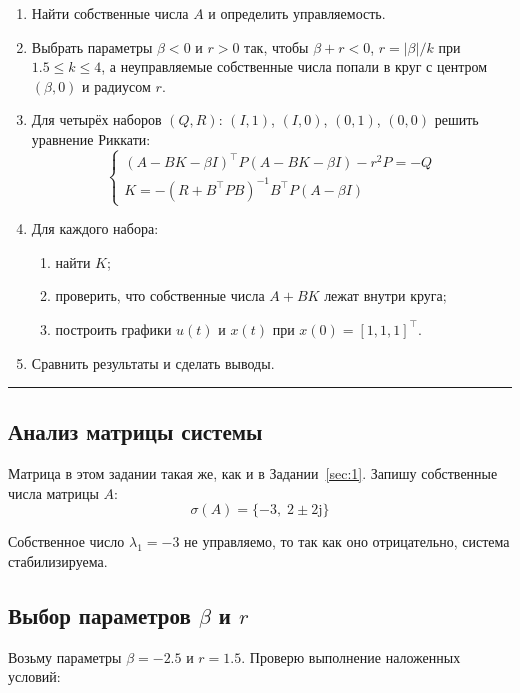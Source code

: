 \documentclass[a4paper,12pt]{article}
\begin{document}
	\begin{enumerate}
		\item Найти собственные числа $A$ и определить управляемость.
		
		\item Выбрать параметры $\beta < 0$ и $r > 0$ так, чтобы $\beta + r < 0$, $r = |\beta|/k$ при $1.5 \leq k \leq 4$, а неуправляемые собственные числа попали в круг с центром $(\beta, 0)$ и радиусом $r$.
		
		\item Для четырёх наборов $(Q, R)$: $(I, 1)$, $(I, 0)$, $(0, 1)$, $(0, 0)$ решить уравнение Риккати:
		\[
		\begin{cases}
			(A - BK - \beta I)^\top P (A - BK - \beta I) - r^2 P = -Q \\[8pt]
			K = -(R + B^\top P B)^{-1} B^\top P (A - \beta I)
		\end{cases}
		\]
		
		\item Для каждого набора:
		\begin{enumerate}
			\item[a)] найти $K$;
			\item[б)] проверить, что собственные числа $A+BK$ лежат внутри круга;
			\item[в)] построить графики $u(t)$ и $x(t)$ при $x(0) = [1,1,1]^\top$.
		\end{enumerate}
		
		\item Сравнить результаты и сделать выводы.
	\end{enumerate}
	
	\hrule \newpage
	
	\subsection{Анализ матрицы системы}
	
	Матрица в этом задании такая же, как и в Задании~\ref{sec:1}. Запишу собственные числа матрицы \(A\):	
	\[
	\sigma(A) = \{-3,\; 2 \pm 2\mathrm{j}\}
	\]
	
	Собственное число \(\lambda_1 = -3\) не управляемо, то так как оно отрицательно, система стабилизируема.
	
	\subsection{Выбор параметров $\beta$ и $r$}
	
	Возьму параметры $\beta = -2.5$ и $r = 1.5$. Проверю выполнение наложенных условий:
	
\end{document}
